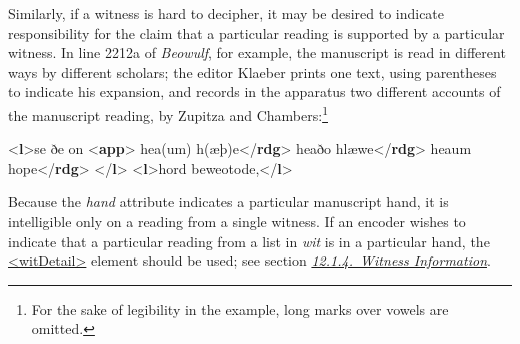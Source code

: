 Similarly, if a witness is hard to decipher, it may be desired to indicate responsibility for the claim that a particular reading is supported by a particular witness. In line 2212a of \textit{Beowulf}, for example, the manuscript is read in different ways by different scholars; the editor Klaeber prints one text, using parentheses to indicate his expansion, and records in the apparatus two different accounts of the manuscript reading, by Zupitza and Chambers:\footnote{For the sake of legibility in the example, long marks over vowels are omitted.} \par\bgroup{}\exampleFont \begin{shaded}\noindent\mbox{}{<\textbf{l}>}se ðe on\mbox{}\newline 
{<\textbf{app}>}\mbox{}\newline 
\hspace*{1em}hea(um) h(æþ)e{</\textbf{rdg}>}\mbox{}\newline 
\hspace*{1em}heaðo hlæwe{</\textbf{rdg}>}\mbox{}\newline 
\hspace*{1em}heaum hope{</\textbf{rdg}>}\mbox{}\newline 
{}\mbox{}\newline 
{</\textbf{l}>}\mbox{}\newline 
{<\textbf{l}>}hord beweotode,{</\textbf{l}>}\end{shaded}\egroup\par \par
Because the {\itshape hand} attribute indicates a particular manuscript hand, it is intelligible only on a reading from a single witness. If an encoder wishes to indicate that a particular reading from a list in {\itshape wit} is in a particular hand, the \hyperref[TEI.witDetail]{<witDetail>} element should be used; see section \textit{\hyperref[TCAPLW]{12.1.4.\ Witness Information}}.\par
